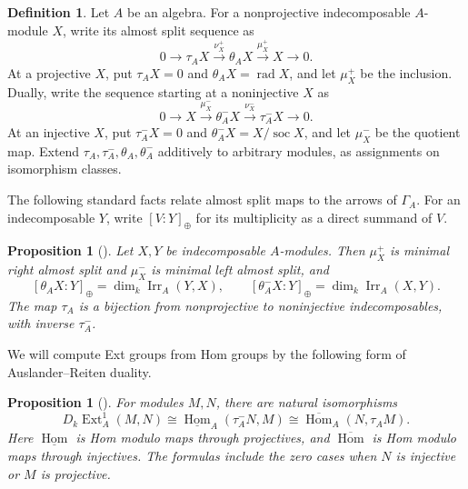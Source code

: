 \documentclass[a4paper,reqno,10pt]{amsart}
\newtheorem{proposition}[theorem]{Proposition}
\theoremstyle{definition}
\newtheorem{definition}[theorem]{Definition}
\numberwithin{equation}{section}
\DeclareMathOperator{\Hom}{Hom}
\DeclareMathOperator{\Ext}{Ext}
\DeclareMathOperator{\Irr}{Irr}
\DeclareMathOperator{\rad}{rad}
\DeclareMathOperator{\soc}{soc}
\newcommand{\Dk}{D_k}
\newcommand{\uhom}{\underline{\Hom}}
\newcommand{\ohom}{\overline{\Hom}}
\begin{document}
\begin{definition}\label{def:ar}
Let \(A\) be an algebra. For a nonprojective indecomposable \(A\)-module
\(X\), write its almost split sequence as
\[
 0\longrightarrow\tau_A X\xrightarrow{\nu_X^+}\theta_A X
 \xrightarrow{\mu_X^+}X\longrightarrow0.
\]
At a projective \(X\), put \(\tau_A X=0\) and \(\theta_A X=\rad X\), and
let \(\mu_X^+\) be the inclusion.
Dually, write the sequence starting at a noninjective \(X\) as
\[
 0\longrightarrow X\xrightarrow{\mu_X^-}\theta_A^-X
 \xrightarrow{\nu_X^-}\tau_A^-X\longrightarrow0.
\]
At an injective \(X\), put \(\tau_A^-X=0\) and \(\theta_A^-X=X/\soc X\),
and let \(\mu_X^-\) be the quotient map.
Extend \(\tau_A,\tau_A^-,\theta_A,\theta_A^-\) additively to arbitrary
modules, as assignments on isomorphism classes.
\end{definition}

The following standard facts relate almost split maps to the arrows of
\(\Gamma_A\). For an indecomposable \(Y\), write \([V:Y]_\oplus\)
for its multiplicity as a direct summand of \(V\).

\begin{proposition}[{\cite[V, Section~1; VII, Proposition~1.3]{ARS}}]\label{prop:ar-multiplicity}
Let \(X,Y\) be indecomposable \(A\)-modules. Then \(\mu_X^+\) is minimal
right almost split and \(\mu_X^-\) is minimal left almost split, and
\begin{equation}\label{eq:ar-multiplicity}
 [\theta_A X:Y]_\oplus=\dim_k\Irr_A(Y,X),\qquad
 [\theta_A^-X:Y]_\oplus=\dim_k\Irr_A(X,Y).
\end{equation}
The map \(\tau_A\) is a bijection from nonprojective to noninjective
indecomposables, with inverse \(\tau_A^-\).
\end{proposition}

We will compute Ext groups from Hom groups by the following form of
Auslander--Reiten duality.
\begin{proposition}[{\cite[IV, Theorem~2.13]{ASS}}]\label{prop:ar-duality}
For modules \(M,N\), there are natural isomorphisms
\begin{equation}\label{eq:ar-duality}
 \Dk\Ext_A^1(M,N)\cong\uhom_A(\tau_A^-N,M)
 \cong\ohom_A(N,\tau_A M).
\end{equation}
Here \(\uhom\) is Hom modulo maps through projectives, and \(\ohom\)
is Hom modulo maps through injectives. The formulas include the zero cases
when \(N\) is injective or \(M\) is projective.
\end{proposition}
\end{document}
